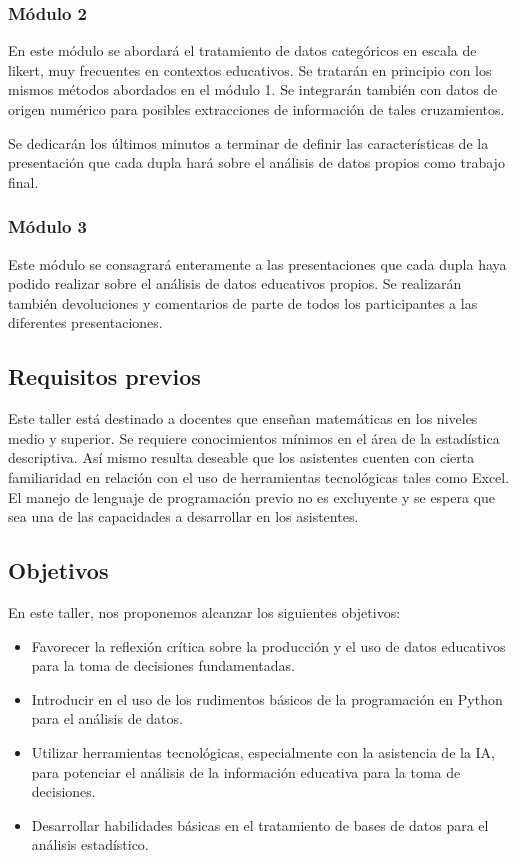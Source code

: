\subsubsection{Módulo 2}

En este módulo se abordará el tratamiento de datos categóricos en escala de likert, muy frecuentes en contextos educativos. Se tratarán en principio con los mismos métodos abordados en el módulo 1. Se integrarán también con datos de origen numérico para posibles extracciones de información de tales cruzamientos.

Se dedicarán los últimos minutos a terminar de definir las características de la presentación que cada dupla hará sobre el análisis de datos propios como trabajo final.

\subsubsection{Módulo 3}

Este módulo se consagrará enteramente a las presentaciones que cada dupla haya podido realizar sobre el análisis de datos educativos propios. Se realizarán también devoluciones y comentarios de parte de todos los participantes a las diferentes presentaciones.

\subsection{Requisitos previos}

Este taller está destinado a docentes que enseñan matemáticas en los niveles medio y superior. Se requiere conocimientos mínimos en el área de la estadística descriptiva. Así mismo resulta deseable que los asistentes cuenten con cierta familiaridad en relación con el uso de herramientas tecnológicas tales como Excel. El manejo de lenguaje de programación previo no es excluyente y se espera que sea una de las capacidades a desarrollar en los asistentes.

\subsection{Objetivos}

En este taller, nos proponemos alcanzar los siguientes objetivos:
\begin{itemize}
	\item Favorecer la reflexión crítica sobre la producción y el uso de datos 	educativos para la toma de decisiones fundamentadas.
	\item Introducir en el uso de los rudimentos básicos de la programación en Python para el análisis de datos.
	\item Utilizar herramientas tecnológicas, especialmente con la asistencia de la IA, para potenciar el análisis de la información educativa para la toma de decisiones.
	\item Desarrollar habilidades básicas en el tratamiento de bases de datos para el análisis estadístico.
\end{itemize}

